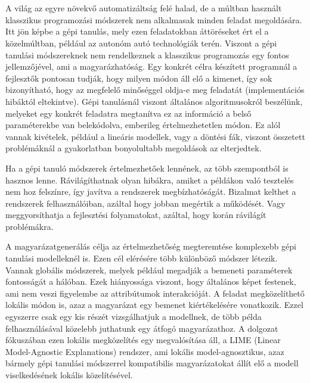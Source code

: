 \chapter{\bevezetes}

A világ az egyre növekvő automatizáltság felé halad, de a múltban használt klasszikus programozási módszerek nem alkalmasak minden feladat megoldására. Itt jön képbe a gépi tanulás, mely ezen feladatokban áttöréseket ért el a közelmúltban, például az autonóm autó technológiák terén. Viszont a gépi tanulási módszereknek nem rendelkeznek a klasszikus programozás egy fontos jellemzőjével, ami a magyarázhatóság. Egy konkrét célra készített programnál a fejlesztők pontosan tudják, hogy milyen módon áll elő a kimenet, így sok bizonyítható, hogy az megfelelő minőséggel oldja-e meg feladatát (implementációs hibáktól eltekintve). Gépi tanulásnál viszont általános algoritmusokról beszélünk, melyeket egy konkrét feladatra megtanítva ez az információ a belső paraméterekbe van belekódolva, emberileg értelmezhetetlen módon. Ez alól vannak kivételek, például a lineáris modellek, vagy a döntési fák, viszont összetett problémáknál a gyakorlatban bonyolultabb megoldások az elterjedtek. 
	
Ha a gépi tanuló módszerek értelmezhetőek lennének, az több szempontból is hasznos lenne. Rávilágíthatnak olyan hibákra, amiket a példákon való tesztelés nem hoz felszínre, így javítva a rendszerek megbízhatóságát. Bizalmat kelthet a rendszerek felhasználóiban, azáltal hogy jobban megértik a működését. Vagy meggyorsíthatja a fejlesztési folyamatokat, azáltal, hogy korán rávilágít problémákra.

A magyarázatgenerálás célja az értelmezhetőség megteremtése komplexebb gépi tanulási modelleknél is. Ezen cél elérésére több különböző módszer létezik. Vannak globális módszerek, melyek például megadják a bemeneti paraméterek fontosságát a hálóban. Ezek hiányossága viszont, hogy általános képet festenek, ami nem veszi figyelembe az attribútumok interakcióját. A feladat megközelíthető lokális módon is, azaz a magyarázat egy bemenet kiértékelésére vonatkozik. Ezzel egyszerre csak egy kis részét vizsgálhatjuk a modellnek, de több példa felhasználásával közelebb juthatunk egy átfogó magyarázathoz. A dolgozat fókuszában ezen lokális megközelítés egy megvalósítása áll, a LIME (Linear Model-Agnostic Explanations) rendszer, ami lokális model-agnosztikus, azaz bármely gépi tanulási módszerrel kompatibilis magyarázatokat állít elő a modell viselkedésének lokális közelítésével.

